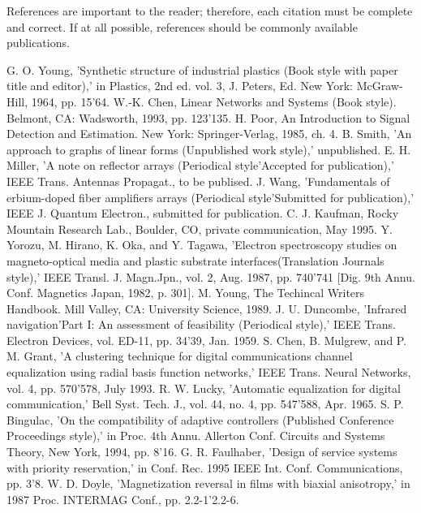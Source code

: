 \documentclass[letterpaper, 10 pt, conference]{ieeeconf}  %
\begin{document}
References are important to the reader; therefore, each citation must be complete and correct. If at all possible, references should be commonly available publications.



\begin{thebibliography}{99}

 G. O. Young, 'Synthetic structure of industrial plastics (Book style with paper title and editor),' 	in Plastics, 2nd ed. vol. 3, J. Peters, Ed.  New York: McGraw-Hill, 1964, pp. 15'64.
 W.-K. Chen, Linear Networks and Systems (Book style).	Belmont, CA: Wadsworth, 1993, pp. 123'135.
 H. Poor, An Introduction to Signal Detection and Estimation.   New York: Springer-Verlag, 1985, ch. 4.
 B. Smith, 'An approach to graphs of linear forms (Unpublished work style),' unpublished.
 E. H. Miller, 'A note on reflector arrays (Periodical style'Accepted for publication),' IEEE Trans. Antennas Propagat., to be publised.
 J. Wang, 'Fundamentals of erbium-doped fiber amplifiers arrays (Periodical style'Submitted for publication),' IEEE J. Quantum Electron., submitted for publication.
 C. J. Kaufman, Rocky Mountain Research Lab., Boulder, CO, private communication, May 1995.
 Y. Yorozu, M. Hirano, K. Oka, and Y. Tagawa, 'Electron spectroscopy studies on magneto-optical media and plastic substrate interfaces(Translation Journals style),' IEEE Transl. J. Magn.Jpn., vol. 2, Aug. 1987, pp. 740'741 [Dig. 9th Annu. Conf. Magnetics Japan, 1982, p. 301].
 M. Young, The Techincal Writers Handbook.  Mill Valley, CA: University Science, 1989.
 J. U. Duncombe, 'Infrared navigation'Part I: An assessment of feasibility (Periodical style),' IEEE Trans. Electron Devices, vol. ED-11, pp. 34'39, Jan. 1959.
 S. Chen, B. Mulgrew, and P. M. Grant, 'A clustering technique for digital communications channel equalization using radial basis function networks,' IEEE Trans. Neural Networks, vol. 4, pp. 570'578, July 1993.
 R. W. Lucky, 'Automatic equalization for digital communication,' Bell Syst. Tech. J., vol. 44, no. 4, pp. 547'588, Apr. 1965.
 S. P. Bingulac, 'On the compatibility of adaptive controllers (Published Conference Proceedings style),' in Proc. 4th Annu. Allerton Conf. Circuits and Systems Theory, New York, 1994, pp. 8'16.
 G. R. Faulhaber, 'Design of service systems with priority reservation,' in Conf. Rec. 1995 IEEE Int. Conf. Communications, pp. 3'8.
 W. D. Doyle, 'Magnetization reversal in films with biaxial anisotropy,' in 1987 Proc. INTERMAG Conf., pp. 2.2-1'2.2-6.

\end{thebibliography}
\end{document}

